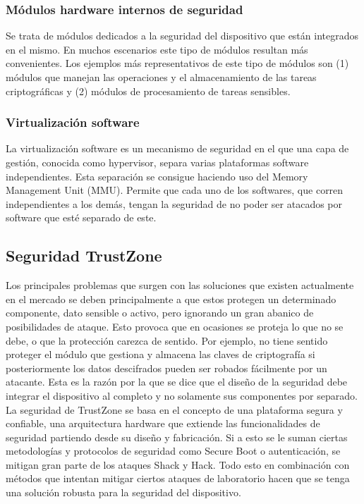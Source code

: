 \subsubsection{Módulos hardware internos de seguridad}
Se trata de módulos dedicados a la seguridad del dispositivo que están integrados en el mismo. En muchos escenarios este tipo de módulos resultan más convenientes. Los ejemplos más representativos de este tipo de módulos son (1) módulos que manejan las operaciones y el almacenamiento de las tareas criptográficas y (2) módulos de procesamiento de tareas sensibles.

\subsubsection{Virtualización software}
La virtualización software es un mecanismo de seguridad en el que una capa de gestión, conocida como hypervisor, separa varias plataformas software independientes. Esta separación se consigue haciendo uso del Memory Management Unit (MMU). Permite que cada uno de los softwares, que corren independientes a los demás, tengan la seguridad de no poder ser atacados por software que esté separado de este.


\subsection{Seguridad TrustZone}

Los principales problemas que surgen con las soluciones que existen actualmente en el mercado se deben principalmente a que estos protegen un determinado componente, dato sensible o activo, pero ignorando un gran abanico de posibilidades de ataque. Esto provoca que en ocasiones se proteja lo que no se debe, o que la protección carezca de sentido. Por ejemplo, no tiene sentido proteger el módulo que gestiona y almacena las claves de criptografía si posteriormente los datos descifrados pueden ser robados fácilmente por un atacante. Esta es la razón por la que se dice que el diseño de la seguridad debe integrar el dispositivo al completo y no solamente sus componentes por separado. \\
La seguridad de TrustZone se basa en el concepto de una plataforma segura y confiable, una arquitectura hardware que extiende las funcionalidades de seguridad partiendo desde su diseño y fabricación. Si a esto se le suman ciertas metodologías y protocolos de seguridad como Secure Boot o autenticación, se mitigan gran parte de los ataques Shack y Hack. Todo esto en combinación con métodos que intentan mitigar ciertos ataques de laboratorio hacen que se tenga una solución robusta para la seguridad del dispositivo.

